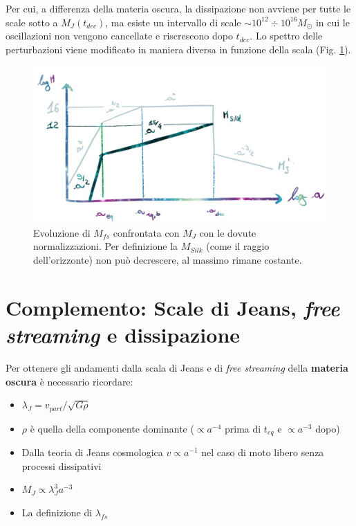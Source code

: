 Per cui, a differenza della materia oscura, la dissipazione non avviene per tutte le scale sotto a $M_J(t_{dec})$, ma esiste un intervallo di scale $\sim 10^{12}\div 10^{16}M_\odot$ in cui le oscillazioni non vengono cancellate e riscrescono dopo $t_{dec}$. Lo spettro delle perturbazioni viene modificato in maniera diversa in funzione della scala (Fig. \ref{fig:7msilkbar}). 
\begin{figure}[H]
    \centering
    \includegraphics[width=.95 \textwidth]{Pictures/7/msilkbar.jpg}
    \caption{Evoluzione di $M_{fs}$ confrontata con $M_J$ con le dovute normalizzazioni. Per definizione la $M_{Silk}$ (come il raggio dell'orizzonte) non può decrescere, al massimo rimane costante.}\label{fig:7msilkbar}
\end{figure}



\newpage
\section{Complemento: Scale di Jeans, \textit{free streaming} e dissipazione}\label{ch7:complementi}

Per ottenere gli andamenti dalla scala di Jeans e di \textit{free streaming} della \textbf{materia oscura} è necessario ricordare:
\begin{itemize}
    \item $\lambda_J = v_{part}/\sqrt{G\rho}$
    \item $\rho$ è quella della componente dominante ($\propto a^{-4}$ prima di $t_{eq}$ e $\propto a^{-3}$ dopo)
    \item Dalla teoria di Jeans cosmologica $v\propto a^{-1}$ nel caso di moto libero senza processi dissipativi
    \item $M_J\propto \lambda_J^3 a^{-3}$
    \item La definizione di $\lambda_{fs}$
\end{itemize}

